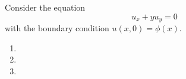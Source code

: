 Consider the equation $$u_x + yu_y = 0$$ with the boundary condition $u(x,0) = \phi(x)$.
\begin{enumerate}
\item \newpage
\item 
\item 
\end{enumerate}
